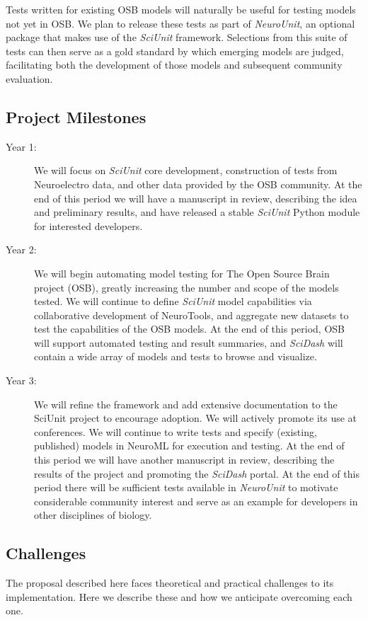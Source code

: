 \documentclass[11pt,letterpaper]{article}
\begin{document}
Tests written for existing OSB models will naturally be useful for testing models not yet in OSB.  We plan to release these tests as part of \textit{NeuroUnit}, an optional package that makes use of the \textit{SciUnit} framework.  Selections from this suite of tests can then serve as a gold standard by which emerging models are judged, facilitating both the development of those models and subsequent community evaluation.  

\subsection{Project Milestones}
\begin{description}
\item[Year 1:] We will focus on \textit{SciUnit} core development, construction of tests from Neuroelectro data, and other data provided by the OSB community.  At the end of this period we will have a manuscript in review, describing the idea and preliminary results, and have released a stable \textit{SciUnit} Python module for interested developers. 
\item[Year 2:] We will begin automating model testing for The Open Source Brain project (OSB), greatly increasing the number and scope of the models tested.  We will continue to define \textit{SciUnit} model capabilities via collaborative development of NeuroTools, and aggregate new datasets to test the capabilities of the OSB models.  At the end of this period, OSB will support automated testing and result summaries, and \textit{SciDash} will contain a wide array of models and tests to browse and visualize.  
\item[Year 3:] We will refine the framework and add extensive documentation to the SciUnit project to encourage adoption.  We will actively promote its use at conferences.  We will continue to write tests and specify (existing, published) models in NeuroML for execution and testing. At the end of this period we will have another manuscript in review, describing the results of the project and promoting the \textit{SciDash} portal.  At the end of this period there will be sufficient tests available in \textit{NeuroUnit} to motivate considerable community interest and serve as an example for developers in other disciplines of biology.  
\end{description}

\subsection{Challenges}
The proposal described here faces theoretical and practical challenges to its implementation.  Here we describe these and how we anticipate overcoming each one.
\end{document}
